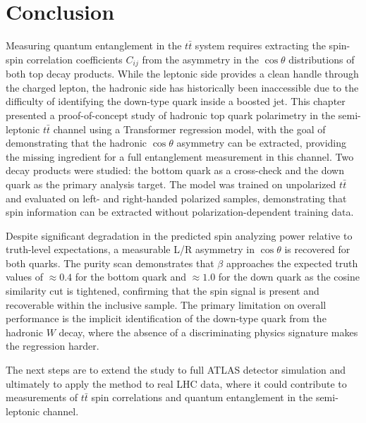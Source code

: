 \section{Conclusion}

Measuring quantum entanglement in the $t\bar{t}$ system requires extracting the spin-spin correlation coefficients $C_{ij}$ from the asymmetry in the $\cos\theta$ distributions of both top decay products.
While the leptonic side provides a clean handle through the charged lepton, the hadronic side has historically been inaccessible due to the difficulty of identifying the down-type quark inside a boosted jet.
This chapter presented a proof-of-concept study of hadronic top quark polarimetry in the semi-leptonic $t\bar{t}$ channel using a Transformer regression model, with the goal of demonstrating that the hadronic $\cos\theta$ asymmetry can be extracted, providing the missing ingredient for a full entanglement measurement in this channel.
Two decay products were studied: the bottom quark as a cross-check and the down quark as the primary analysis target.
The model was trained on unpolarized $t\bar{t}$ and evaluated on left- and right-handed polarized samples, demonstrating that spin information can be extracted without polarization-dependent training data.

Despite significant degradation in the predicted spin analyzing power relative to truth-level expectations, a measurable L/R asymmetry in $\cos\theta$ is recovered for both quarks. 
The purity scan demonstrates that $\beta$ approaches the expected truth values of $\approx 0.4$ for the bottom quark and $\approx 1.0$ for the down quark as the cosine similarity cut is tightened, confirming that the spin signal is present and recoverable within the inclusive sample. 
The primary limitation on overall performance is the implicit identification of the down-type quark from the hadronic $W$ decay, where the absence of a discriminating physics signature makes the regression harder.
 
The next steps are to extend the study to full ATLAS detector simulation and ultimately to apply the method to real LHC data, where it could contribute to measurements of $t\bar{t}$ spin correlations and quantum entanglement in the semi-leptonic channel.


